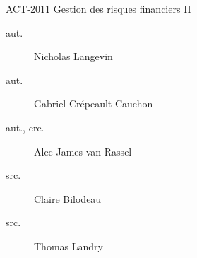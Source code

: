 \begin{contrib}{ACT-2011\: Gestion des risques financiers II}
\begin{description}
	\item[aut.] Nicholas Langevin
	\item[aut.] Gabriel Crépeault-Cauchon 
	\item[aut., cre.] Alec James van Rassel
	\item[src.] Claire Bilodeau
	\item[src.] Thomas Landry	
\end{description}
\end{contrib}
